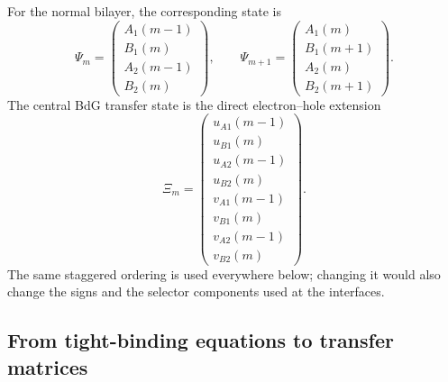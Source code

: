 For the normal bilayer, the corresponding state is
\begin{equation}
    \Psi_m=
    \begin{pmatrix}
        A_1(m-1)\\ B_1(m)\\ A_2(m-1)\\ B_2(m)
    \end{pmatrix},
    \qquad
    \Psi_{m+1}=
    \begin{pmatrix}
        A_1(m)\\ B_1(m+1)\\ A_2(m)\\ B_2(m+1)
    \end{pmatrix}.
    \label{eq:bilayer-state}
\end{equation}
The central BdG transfer state is the direct electron--hole extension
\begin{equation}
    \Xi_m=
    \begin{pmatrix}
        u_{A1}(m-1)\\
        u_{B1}(m)\\
        u_{A2}(m-1)\\
        u_{B2}(m)\\
        v_{A1}(m-1)\\
        v_{B1}(m)\\
        v_{A2}(m-1)\\
        v_{B2}(m)
    \end{pmatrix}.
    \label{eq:central-BdG-state}
\end{equation}
The same staggered ordering is used everywhere below; changing it would also change the signs and the selector components used at the interfaces.

\subsection{From tight-binding equations to transfer matrices}
\label{subsec:tight-binding-to-transfer}

